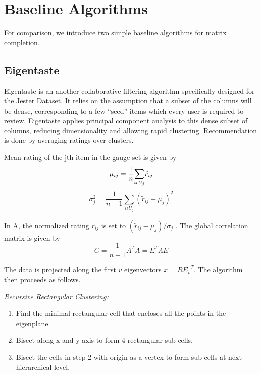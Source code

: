 \documentclass{article} %
\begin{document}
\section{Baseline Algorithms}

For comparison, we introduce two simple baseline algorithms for matrix
completion.

\subsection{Eigentaste}

Eigentaste \cite{r31} is an another collaborative filtering algorithm specifically
designed for the Jester Dataset. It relies on the assumption that a
subset of the columns will be dense, corresponding to a few ``seed''
items which every user is required to review. Eigentaste applies
principal component analysis to this dense subset of columns, reducing
dimensionality and allowing rapid clustering. Recommendation is done
by averaging ratings over clusters.

Mean rating of the jth item in the gauge set is given by
\begin{equation*}
\mu_{ij}=\frac{1}{n}{\sum_{i\epsilon U_{j}}}\widetilde{r}_{ij}\\
\end{equation*}
\begin{equation*}
\sigma_j^2=\frac{1}{n-1}{\sum_{i\epsilon U_{j}}}({\widetilde{r}_{ij}-\mu_{j}})^{2}
\end{equation*}

In A, the normalized rating $r_{ij}$ is set to
$({\widetilde{r}_{ij}-\mu_{j}})/\sigma _{j}$ . The global correlation
matrix is given by
\begin{equation*}
C=\frac{1}{n-1}A^{T}A=E^{T} \Lambda E
\end{equation*}

The data is projected along the first $v$ eigenvectors
$x=R{E_{v}}^{T}$. The algorithm then proceeds as follows.

\textit{Recursive Rectangular Clustering: }

\begin{enumerate}
\item Find the minimal rectangular cell that encloses all the points
  in the eigenplane.
\item Bisect along x and y axis to form 4 rectangular sub-cells.
\item Bisect the cells in step 2 with origin as a vertex to form
  sub-cells at next hierarchical level.
\end{enumerate}
\end{document}
